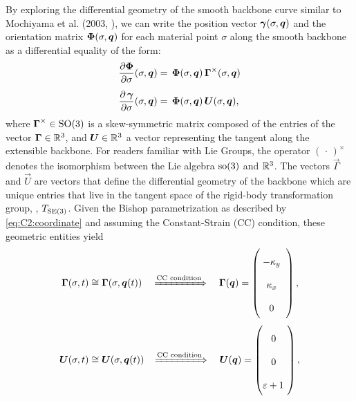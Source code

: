 By exploring the differential geometry of the smooth backbone curve similar to Mochiyama et al. (2003, \cite{Mochiyama2003}), we can write the position vector ${\boldsymbol{\gamma}}(\sigma,{\boldsymbol{q}})$ and the orientation matrix ${\boldsymbol{\Phi}}(\sigma,{\boldsymbol{q}})$ for each material point $\sigma$ along the smooth backbone as a differential equality of the form:
%
\begin{align}
\renewcommand*{\arraystretch}{2}{}
\frac{\partial \,\!\mat{\Phi}}{\partial \sigma}(\sigma,\q) & = \, \mat{\Phi}(\sigma,\vec{q}) \,\mat{\Gamma}^{\times} (\sigma,\q) \label{eq:C2:change_phi} \\[0.45em]
%
\frac{\partial \, \gammaB}{\partial \sigma}(\sigma,\q) & = \, \mat{\Phi}(\sigma,\vec{q}) \, \vec{U}(\sigma,\q), \label{eq:C2:change_p}
\end{align}
%
where $\boldsymbol{\Gamma}^\times \in \textup{\textrm{SO}}(3)$ is a skew-symmetric matrix composed of the entries of the vector $\boldsymbol{\Gamma} \in \mathbb{R}^3$, and $\boldsymbol{U}\in \mathbb{R}^3$ a vector representing the tangent along the extensible backbone. For readers familiar with Lie Groups, the operator $(\,\cdot\,)^\times$ denotes the isomorphism between the Lie algebra $\textup{\textrm{so}}(3)$ and $\mathbb{R}^3$. The vectors $\vec{\Gamma}$ and $\vec{U}$ are vectors that define the differential geometry of the backbone
\cite{Mochiyama2003} which are unique entries that live in the tangent space of the rigid-body transformation group, \ie, $T_{\textup{\textrm{SE}}(3)}$. Given the Bishop parametrization as described by \eqref{eq:C2:coordinate} and assuming the Constant-Strain (CC) condition, these geometric entities yield
%
\begin{align}
\vec{\Gamma}(\sigma,t) & \cong \vec{\Gamma}(\sigma,\q(t)) \quad \xRightarrow[]{\textrm{CC condition}}\quad \vec{\Gamma}(\q) = \begin{pmatrix} \;-\kappa_y\;\; \\ \;\kappa_x\;\; \\ \;0\;\;  \end{pmatrix}, \\[0.35em]
%
\vec{U}(\sigma,t) & \cong \vec{U}(\sigma,\q(t)) \!\quad \xRightarrow[]{\textrm{CC condition}} \quad \vec{U}(\q) =  \begin{pmatrix} \;0\;\;  \\  \;0\;\; \\ \varepsilon + 1\ \end{pmatrix},
\end{align}
%
